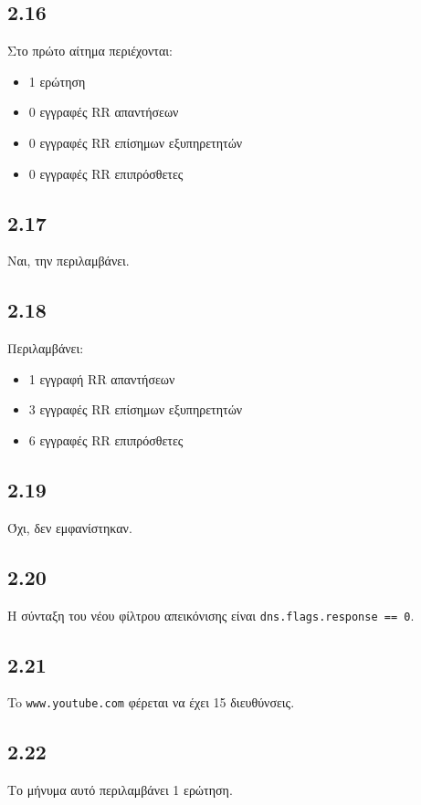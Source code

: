 		\subsection*{2.16} 
			Στο πρώτο αίτημα περιέχονται:
			\begin{itemize}
				\item 1 ερώτηση
				\item 0 εγγραφές RR απαντήσεων
				\item 0 εγγραφές RR επίσημων εξυπηρετητών
				\item 0 εγγραφές RR επιπρόσθετες
			\end{itemize}

		\subsection*{2.17} 
			Ναι, την περιλαμβάνει.

		\subsection*{2.18} 
			Περιλαμβάνει:
			\begin{itemize}
				\item 1 εγγραφή RR απαντήσεων
				\item 3 εγγραφές RR επίσημων εξυπηρετητών
				\item 6 εγγραφές RR επιπρόσθετες
			\end{itemize}

		\subsection*{2.19} 
			Όχι, δεν εμφανίστηκαν.

		\subsection*{2.20} 
			Η σύνταξη του νέου φίλτρου απεικόνισης είναι \verb|dns.flags.response == 0|.

		\subsection*{2.21} 
			To \verb|www.youtube.com| φέρεται να έχει 15 διευθύνσεις.

		\subsection*{2.22} 
			Το μήνυμα αυτό περιλαμβάνει 1 ερώτηση.

